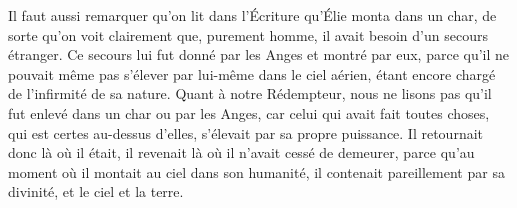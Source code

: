 Il faut aussi remarquer qu’on lit dans l’Écriture qu’Élie monta dans un char, de sorte qu’on voit clairement que, purement homme, il avait besoin d’un secours étranger. Ce secours lui fut donné par les Anges et montré par eux, parce qu’il ne pouvait même pas s’élever par lui-même dans le ciel aérien, étant encore chargé de l’infirmité de sa nature. Quant à notre Rédempteur, nous ne lisons pas qu’il fut enlevé dans un char ou par les Anges, car celui qui avait fait toutes choses, qui est certes au-dessus d’elles, s’élevait par sa propre puissance. Il retournait donc là où il était, il revenait là où il n’avait cessé de demeurer, parce qu’au moment où il montait au ciel dans son humanité, il contenait pareillement par sa divinité, et le ciel et la terre.